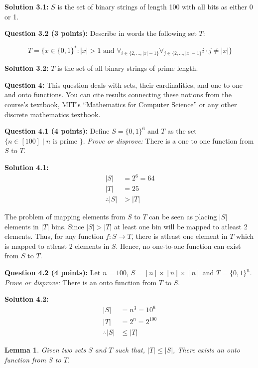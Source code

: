 \documentclass[11pt]{article}
\newtheorem{lemma}[theorem]{Lemma}
\begin{document}
\textbf{Solution 3.1:} $S$ is the set of binary strings of length 100 with all
bits as either 0 or 1.

\textbf{Question 3.2 (3 points):} Describe in words the following set
\(T\):

\[
    T = \{ x\in \{0,1\}^* : |x|>1 \mbox{ and } \forall_{i \in \{2,\ldots,|x|-1 \} } \forall_{j \in \{2,\ldots,|x|-1\}} i\cdot j \neq |x| \}
\]

\textbf{Solution 3.2:} $T$ is the set of all binary strings of prime length.

\textbf{Question 4:} This question deals with sets, their cardinalities,
and one to one and onto functions. You can cite results connecting these
notions from the course's textbook, MIT's ``Mathematics for Computer
Science'' or any other discrete mathematics textbook.

\textbf{Question 4.1 (4 points):} Define \(S = \{0,1\}^6\) and \(T\) as
the set \(\{ n \in [100] \;|\; \mbox{$n$ is prime } \}\). \emph{Prove or
disprove:} There is a one to one function from \(S\) to \(T\).

\textbf{Solution 4.1:} 
\begin{align*}
    |S| &= 2^{6} = 64\\
    |T| &= 25\\
    \therefore |S| &> |T|
\end{align*}

The problem of mapping elements from $S$ to $T$ can be seen as placing $|S|$
elements in $|T|$ bins. Since $|S| > |T|$ at least one bin will be mapped to
atleast 2 elements. Thus, for any function $f: S \rightarrow T$, there is
atleast one element in $T$ which is mapped to atleast 2 elements in $S$. Hence,
no one-to-one function can exist from $S$ to $T$.

\textbf{Question 4.2 (4 points):} Let \(n=100\),
\(S = [n] \times [n] \times [n]\) and \(T=\{0,1\}^n\). \emph{Prove or
disprove:} There is an onto function from \(T\) to \(S\).

\textbf{Solution 4.2:}
\begin{align*}
    |S| &= n^{3} = 10^{6}\\
    |T| &= 2^{n} = 2^{100}\\
    \therefore |S| &\le |T|
\end{align*}

\begin{lemma}
    \label{th1}
    Given two sets $S$ and $T$ such that, $|T| \le |S|$, There exists an onto 
    function from $S$ to $T$.
\end{lemma}
\end{document}
